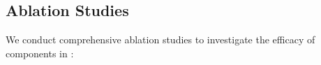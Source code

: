 \subsection{Ablation Studies}
\label{subsec:ablation}
We conduct comprehensive ablation studies to investigate the efficacy of components in \ourMethod{}:








